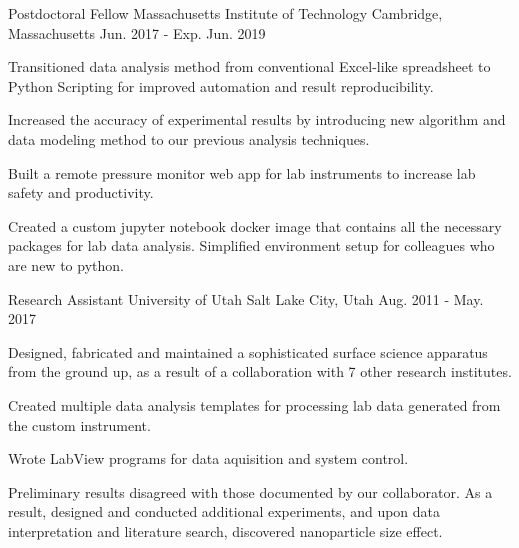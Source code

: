 


\begin{cventries}


\cventry
{Postdoctoral Fellow}
{Massachusetts Institute of Technology}
{Cambridge, Massachusetts}
{Jun. 2017 - Exp. Jun. 2019}
{
\begin{cvitems}
\item {Transitioned data analysis method from conventional Excel-like
    spreadsheet to Python Scripting for improved automation and result
    reproducibility.}
\item {Increased the accuracy of experimental results by introducing new
    algorithm and data modeling method to our previous analysis techniques.}
\item {Built a remote pressure monitor web app for lab instruments to increase
    lab safety and productivity.}
\item {Created a custom jupyter notebook docker image that contains all the
    necessary packages for lab data analysis. Simplified environment setup for
    colleagues who are new to python.}
\end{cvitems}
}


\cventry
{Research Assistant}
{University of Utah}
{Salt Lake City, Utah}
{Aug. 2011 - May. 2017}
{
\begin{cvitems}
\item {Designed, fabricated and maintained a sophisticated surface science
    apparatus from the ground up, as a result of a collaboration with 7 other
    research institutes.}
\item {Created multiple data analysis templates for processing lab data
    generated from the custom instrument.}
\item {Wrote LabView programs for data aquisition and system control.}
\item {Preliminary results disagreed with those documented by our collaborator.
    As a result, designed and conducted additional experiments, and upon data
    interpretation and literature search, discovered nanoparticle size effect.}
\end{cvitems}
}


\end{cventries}
